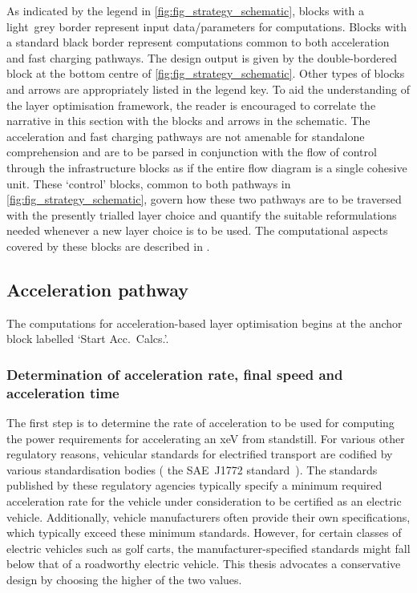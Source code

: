 As indicated by  the legend in \cref{fig:fig_strategy_schematic},  blocks with a
light~grey border represent input  data/parameters for computations. Blocks with
a standard black  border represent computations common to  both acceleration and
fast charging pathways. The design output  is given by the double-bordered block
at  the  bottom  centre  of \cref{fig:fig_strategy_schematic}.  Other  types  of
blocks  and arrows  are  appropriately listed  in  the legend  key.  To aid  the
understanding of the  layer optimisation framework, the reader  is encouraged to
correlate  the narrative  in this  section  with the  blocks and  arrows in  the
schematic.  The  acceleration  and  fast  charging  pathways  are  not  amenable
for  standalone comprehension  and  are to  be parsed  in  conjunction with  the
flow  of  control through  the  infrastructure  blocks  as  if the  entire  flow
diagram  is a  single  cohesive unit.  These `control'  blocks,  common to  both
pathways  in \cref{fig:fig_strategy_schematic},  govern how  these two  pathways
are  to be  traversed  with the  presently trialled  layer  choice and  quantify
the  suitable  reformulations needed  whenever  a  new  layer  choice is  to  be
used.  The  computational aspects  covered  by  these  blocks are  described  in
.

\subsection{Acceleration pathway}\label{sec:accpathway}

The computations for acceleration-based layer  optimisation begins at the anchor
block labelled `Start Acc.\ Calcs.'.

\subsubsection*{Determination of acceleration rate, final speed and acceleration time}

The  first  step is  to  determine  the rate  of  acceleration  to be  used  for
computing the power requirements for  accelerating an \gls{xeV} from standstill.
For  various  other  regulatory  reasons, vehicular  standards  for  electrified
transport are  codified by various  standardisation bodies (\eg{}  the SAE~J1772
standard~\cite{Sae2010}). The  standards published by these  regulatory agencies
typically specify  a minimum  required acceleration rate  for the  vehicle under
consideration  to be  certified as  an electric  vehicle. Additionally,  vehicle
manufacturers  often provide  their own  specifications, which  typically exceed
these minimum standards. However, for  certain classes of electric vehicles such
as golf carts,  the manufacturer-specified standards might fall below  that of a
roadworthy  electric vehicle.  This thesis  advocates a  conservative design  by
choosing the higher of the two values.


